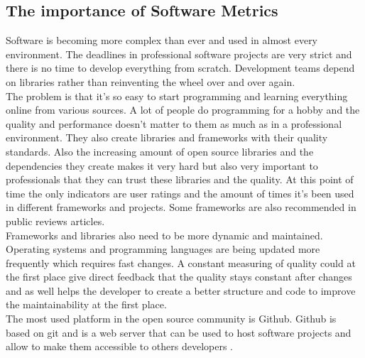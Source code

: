 \subsection{The importance of Software Metrics}
Software is becoming more complex than ever and used in almost every environment. The deadlines in professional software projects are very strict and there is no time to develop everything from scratch. Development teams depend on libraries rather than reinventing the wheel over and over again. \\
The problem is that it's so easy to start programming and learning everything online from various sources. A lot of people do programming for a hobby and the quality and performance doesn't matter to them as much as in a professional environment. They also create libraries and frameworks with their quality standards. Also the increasing amount of open source libraries and the dependencies they create makes it very hard but also very important to professionals that they can trust these libraries and the quality. At this point of time the only indicators are user ratings and the amount of times it's been used in different frameworks and projects. Some frameworks are also recommended in public reviews articles. \\
Frameworks and libraries also need to be more dynamic and maintained. Operating systems and programming languages are being updated more frequently which requires fast changes. A constant measuring of quality could at the first place give direct feedback that the quality stays constant after changes and as well helps the developer to create a better structure and code to improve the maintainability at the first place. \\
The most used platform in the open source community is Github. Github is based on git and is a web server that can be used to host software projects and allow to make them accessible to others developers  \cite{dabbish2012social}.

